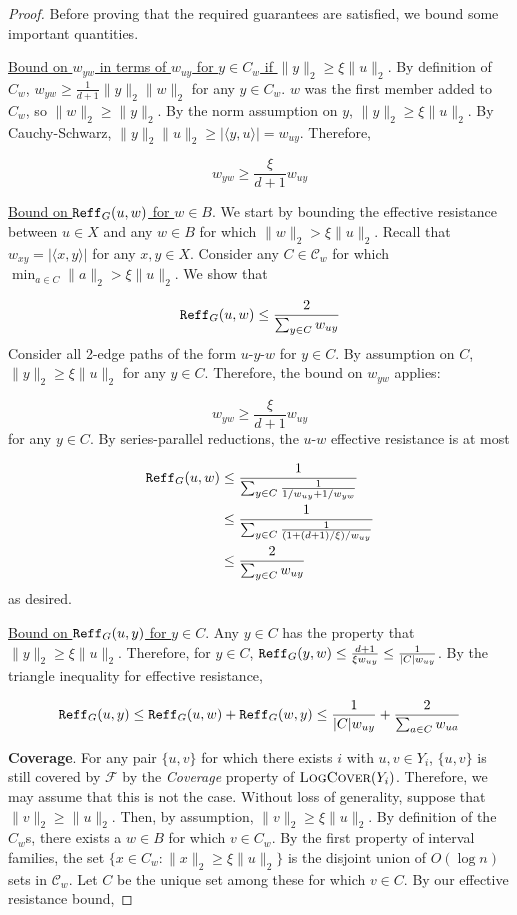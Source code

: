 \begin{proof}
Before proving that the required guarantees are satisfied, we bound some important quantities.

\underline{Bound on $w_{yw}$ in terms of $w_{uy}$ for $y\in C_w$ if $\|y\|_2 \ge \xi \|u\|_2$}. By definition of $C_w$, $w_{yw}\ge \frac{1}{d+1} \|y\|_2 \|w\|_2$ for any $y\in C_w$. $w$ was the first member added to $C_w$, so $\|w\|_2\ge \|y\|_2$. By the norm assumption on $y$, $\|y\|_2 \ge \xi \|u\|_2$. By Cauchy-Schwarz, $\|y\|_2 \|u\|_2 \ge |\langle y,u\rangle| = w_{uy}$. Therefore,

$$w_{yw} \ge \frac{\xi}{d+1} w_{uy}$$

\underline{Bound on $\mathtt{Reff}_G(u,w)$ for $w\in B$}. We start by bounding the effective resistance between $u\in X$ and any $w\in B$ for which $\|w\|_2 > \xi \|u\|_2$. Recall that $w_{xy} = |\langle x,y\rangle|$ for any $x,y\in X$. Consider any $C\in \mathcal C_w$ for which $\min_{a\in C} \|a\|_2 > \xi \|u\|_2$. We show that

$$\mathtt{Reff}_G(u,w) \le \frac{2}{\sum_{y\in C} w_{uy}}$$
Consider all 2-edge paths of the form $u$-$y$-$w$ for $y\in C$. By assumption on $C$, $\|y\|_2\ge \xi \|u\|_2$ for any $y\in C$. Therefore, the bound on $w_{yw}$ applies:

$$w_{yw} \ge \frac{\xi}{d+1} w_{uy}$$
for any $y\in C$. By series-parallel reductions, the $u$-$w$ effective resistance is at most

\begin{align*}
    \mathtt{Reff}_G(u,w) &\le \frac{1}{\sum_{y\in C} \frac{1}{1/w_{uy} + 1/w_{yw}}}\\
    &\le \frac{1}{\sum_{y\in C} \frac{1}{(1 + (d+1)/\xi)/w_{uy}}}\\
    &\le \frac{2}{\sum_{y\in C} w_{uy}}\\
\end{align*}
as desired.

\underline{Bound on $\mathtt{Reff}_G(u,y)$ for $y\in C$}. Any $y\in C$ has the property that $\|y\|_2\ge \xi \|u\|_2$. Therefore, for $y\in C$, $\mathtt{Reff}_G(y,w)\le \frac{d+1}{\xi w_{uy}} \le \frac{1}{|C| w_{uy}}$. By the triangle inequality for effective resistance,

$$\mathtt{Reff}_G(u,y)\le \mathtt{Reff}_G(u,w) + \mathtt{Reff}_G(w,y)\le \frac{1}{|C| w_{uy}} + \frac{2}{\sum_{a\in C} w_{ua}}$$

\textbf{Coverage}. For any pair $\{u,v\}$ for which there exists $i$ with $u,v\in Y_i$, $\{u,v\}$ is still covered by $\mathcal F$ by the \emph{Coverage} property of $\textsc{LogCover}(Y_i)$. Therefore, we may assume that this is not the case. Without loss of generality, suppose that $\|v\|_2 \ge \|u\|_2$. Then, by assumption, $\|v\|_2\ge \xi \|u\|_2$. By definition of the $C_w$s, there exists a $w\in B$ for which $v\in C_w$. By the first property of interval families, the set $\{x\in C_w: \|x\|_2 \ge \xi \|u\|_2\}$ is the disjoint union of $O(\log n)$ sets in $\mathcal C_w$. Let $C$ be the unique set among these for which $v\in C$. By our effective resistance bound,


\end{proof}
